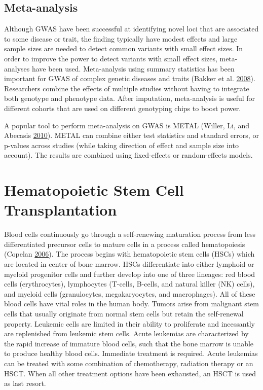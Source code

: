 \documentclass[]{DissertateOSU}
\begin{document}
\subsection{Meta-analysis}\label{meta-analysis}

Although GWAS have been successful at identifying novel loci that are
associated to some disease or trait, the finding typically have modest
effects and large sample sizes are needed to detect common variants with
small effect sizes. In order to improve the power to detect variants
with small effect sizes, meta-analyses have been used. Meta-analysis
using summary statistics has been important for GWAS of complex genetic
diseases and traits (Bakker et al.
\protect\hyperlink{ref-bakker_2008}{2008}). Researchers combine the
effects of multiple studies without having to integrate both genotype
and phenotype data. After imputation, meta-analysis is useful for
different cohorts that are used on different genotyping chips to boost
power.

A popular tool to perform meta-analysis on GWAS is METAL (Willer, Li,
and Abecasis \protect\hyperlink{ref-metal}{2010}). METAL can combine
either test statistics and standard errors, or p-values across studies
(while taking direction of effect and sample size into account). The
results are combined using fixed-effects or random-effects models.

\section{Hematopoietic Stem Cell
Transplantation}\label{hematopoietic-stem-cell-transplantation}

Blood cells continuously go through a self-renewing maturation process
from less differentiated precursor cells to mature cells in a process
called hematopoiesis (Copelan
\protect\hyperlink{ref-copelan_2006}{2006}). The process begins with
hematopoietic stem cells (HSCs) which are located in center of bone
marrow. HSCs differentiate into either lymphoid or myeloid progenitor
cells and further develop into one of three lineages: red blood cells
(erythrocytes), lymphocytes (T-cells, B-cells, and natural killer (NK)
cells), and myeloid cells (granulocytes, megakaryocytes, and
macrophages). All of these blood cells have vital roles in the human
body. Tumors arise from malignant stem cells that usually originate from
normal stem cells but retain the self-renewal property. Leukemic cells
are limited in their ability to proliferate and incessantly are
replenished from leukemic stem cells. Acute leukemias are characterized
by the rapid increase of immature blood cells, such that the bone marrow
is unable to produce healthy blood cells. Immediate treatment is
required. Acute leukemias can be treated with some combination of
chemotherapy, radiation therapy or an HSCT. When all other treatment
options have been exhausted, an HSCT is used as last resort.
\end{document}
